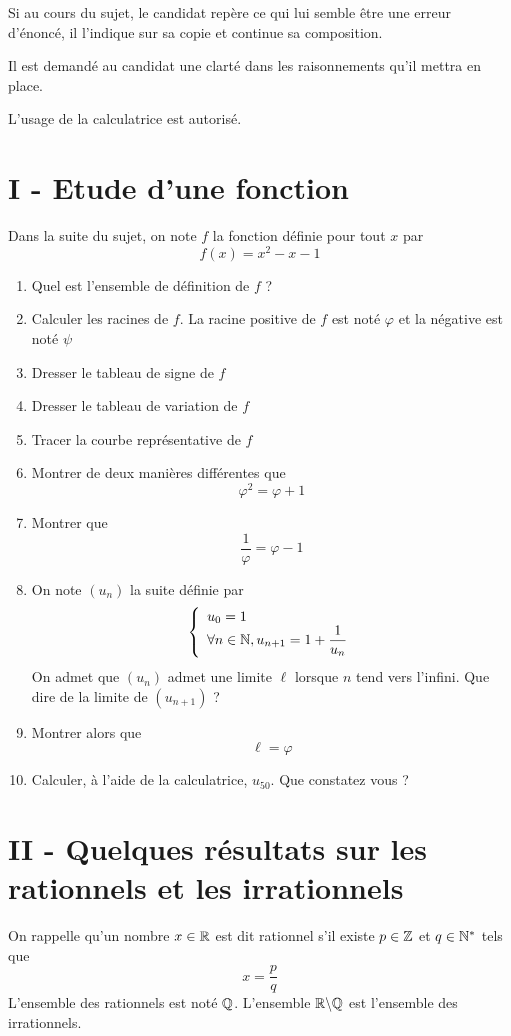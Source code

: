 

\usepackage{tcolorbox}



\flushleft
Si au cours du sujet, le candidat repère ce qui lui semble être une erreur d'énoncé, il l'indique sur sa copie et continue sa composition. \newline

Il est demandé au candidat une clarté dans les raisonnements qu'il mettra en place. \newline

L'usage de la calculatrice est autorisé.\newline

\section*{I - Etude d'une fonction}
Dans la suite du sujet, on note $f$ la fonction définie pour tout $x$ par $$f(x) = x^2-x-1$$
\begin{enumerate}
\item Quel est l'ensemble de définition de $f$ ?
\item Calculer les racines de $f$. La racine positive de $f$ est noté $\varphi$ et la négative est noté $\psi$
\item Dresser le tableau de signe de $f$
\item Dresser le tableau de variation de $f$
\item Tracer la courbe représentative de $f$
\item Montrer de deux manières différentes que $$\varphi^2 = \varphi +1$$
\item Montrer que $$\dfrac{1}{\varphi} = \varphi -1$$
\item On note $(u_n)$ la suite définie par $$\left\lbrace \begin{array}{l}
u_0 = 1\\
\forall n \in \mathbb{N}, u_{n+1} = 1 + \dfrac{1}{u_n}
\end{array}
\right.$$
On admet que $(u_n)$ admet une limite $\ell$ lorsque $n$ tend vers l'infini. Que dire de la limite de $(u_{n+1})$ ?
\item Montrer alors que 
$$\ell = \varphi$$
\item Calculer, à l'aide de la calculatrice, $u_{50}$. Que constatez vous ?
\end{enumerate}
\section*{II - Quelques résultats sur les rationnels et les irrationnels}
On rappelle qu'un nombre $x \in \mathbb{R}$ est dit rationnel s'il existe $p \in \mathbb{Z}$ et $q\in \mathbb{N}^*$  tels que $$x = \dfrac{p}{q}$$ L'ensemble des rationnels est noté $\mathbb{Q}$. L'ensemble $\mathbb{R} \backslash \mathbb{Q}$ est l'ensemble des irrationnels.\newline

